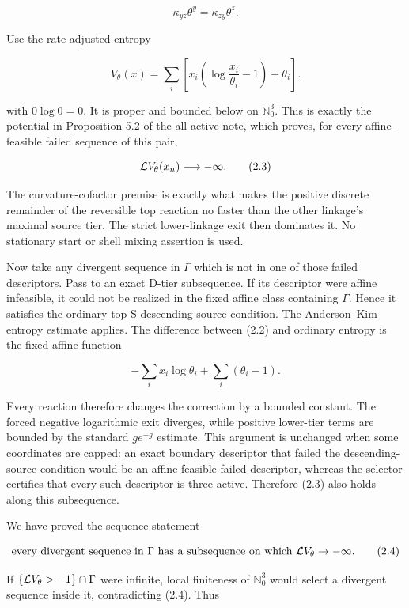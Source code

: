 \[
 \kappa_{yz}\theta^y=\kappa_{zy}\theta^z .             \tag{2.1}
\]

Use the rate-adjusted entropy

\[
 V_\theta(x)=
 \sum_i\left[x_i\left(\log\frac{x_i}{\theta_i}-1\right)
                  +\theta_i\right].                     \tag{2.2}
\]

with \(0\log0=0\). It is proper and bounded below on \(\mathbb N_0^3\).
This is exactly the potential in Proposition 5.2 of the all-active note,
which proves, for every affine-feasible failed sequence of this pair,

\[
 {\cal L}V_\theta(x_n)\longrightarrow-\infty .          \tag{2.3}
\]

The curvature-cofactor premise is exactly what makes the positive
discrete remainder of the reversible top reaction no faster than the
other linkage's maximal source tier. The strict lower-linkage exit then
dominates it. No stationary start or shell mixing assertion is used.

Now take any divergent sequence in \(\Gamma\) which is not in one of
those failed descriptors. Pass to an exact D-tier subsequence. If its
descriptor were affine infeasible, it could not be realized in the fixed
affine class containing \(\Gamma\). Hence it satisfies the ordinary
top-S descending-source condition. The Anderson--Kim entropy estimate
applies. The difference between (2.2) and ordinary entropy is the fixed
affine function

\[
 -\sum_i x_i\log\theta_i+\sum_i(\theta_i-1).             \tag{2.3a}
\]

Every reaction therefore changes the correction by a bounded constant.
The forced negative logarithmic exit diverges, while positive lower-tier
terms are bounded by the standard \(g e^{-g}\) estimate. This argument
is unchanged when some coordinates are capped: an exact boundary
descriptor that failed the descending-source condition would be an
affine-feasible failed descriptor, whereas the selector certifies that
every such descriptor is three-active. Therefore (2.3) also holds along
this subsequence.

We have proved the sequence statement

\[
 \text{every divergent sequence in }\Gamma
 \text{ has a subsequence on which }{\cal L}V_\theta\to-\infty . \tag{2.4}
\]

If \(\{{\cal L}V_\theta>-1\}\cap\Gamma\) were infinite, local finiteness
of \(\mathbb N_0^3\) would select a divergent sequence inside it,
contradicting (2.4). Thus

